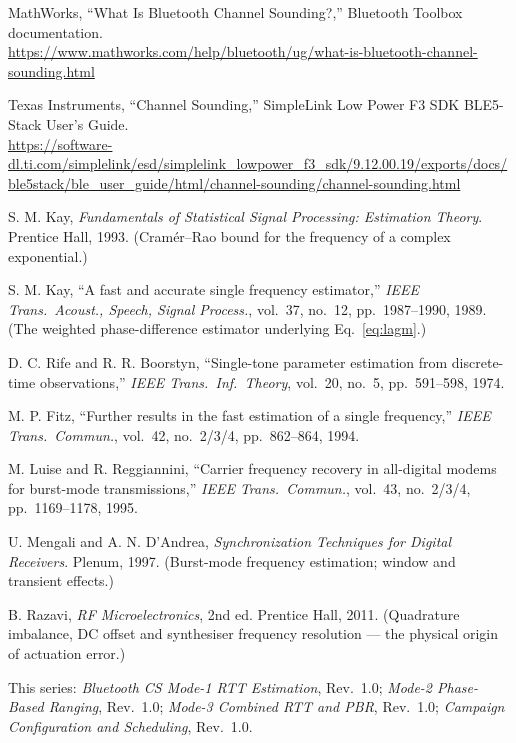 \documentclass[11pt,a4paper]{article}
\begin{document}
\begin{enumerate}[label={[\arabic*]},leftmargin=2.2em,itemsep=3pt]
\item MathWorks, ``What Is Bluetooth Channel Sounding?,'' Bluetooth Toolbox documentation.\\
  {\small\url{https://www.mathworks.com/help/bluetooth/ug/what-is-bluetooth-channel-sounding.html}}

\item Texas Instruments, ``Channel Sounding,'' SimpleLink Low Power F3 SDK BLE5-Stack User's Guide.\\
  {\small\url{https://software-dl.ti.com/simplelink/esd/simplelink_lowpower_f3_sdk/9.12.00.19/exports/docs/ble5stack/ble_user_guide/html/channel-sounding/channel-sounding.html}}

\item S. M. Kay, \emph{Fundamentals of Statistical Signal Processing: Estimation Theory}.
  Prentice Hall, 1993. (Cram\'er--Rao bound for the frequency of a complex exponential.)

\item S. M. Kay, ``A fast and accurate single frequency estimator,'' \emph{IEEE Trans.\ Acoust.,
  Speech, Signal Process.}, vol.\ 37, no.\ 12, pp.\ 1987--1990, 1989. (The weighted phase-difference
  estimator underlying Eq.~\eqref{eq:lagm}.)

\item D. C. Rife and R. R. Boorstyn, ``Single-tone parameter estimation from discrete-time
  observations,'' \emph{IEEE Trans.\ Inf.\ Theory}, vol.\ 20, no.\ 5, pp.\ 591--598, 1974.

\item M. P. Fitz, ``Further results in the fast estimation of a single frequency,'' \emph{IEEE Trans.\
  Commun.}, vol.\ 42, no.\ 2/3/4, pp.\ 862--864, 1994.

\item M. Luise and R. Reggiannini, ``Carrier frequency recovery in all-digital modems for burst-mode
  transmissions,'' \emph{IEEE Trans.\ Commun.}, vol.\ 43, no.\ 2/3/4, pp.\ 1169--1178, 1995.

\item U. Mengali and A. N. D'Andrea, \emph{Synchronization Techniques for Digital Receivers}.
  Plenum, 1997. (Burst-mode frequency estimation; window and transient effects.)

\item B. Razavi, \emph{RF Microelectronics}, 2nd ed. Prentice Hall, 2011. (Quadrature imbalance, DC
  offset and synthesiser frequency resolution --- the physical origin of actuation error.)

\item This series: \emph{Bluetooth CS Mode-1 RTT Estimation}, Rev.\ 1.0;
  \emph{Mode-2 Phase-Based Ranging}, Rev.\ 1.0; \emph{Mode-3 Combined RTT and PBR}, Rev.\ 1.0;
  \emph{Campaign Configuration and Scheduling}, Rev.\ 1.0.
\end{enumerate}
\end{document}

